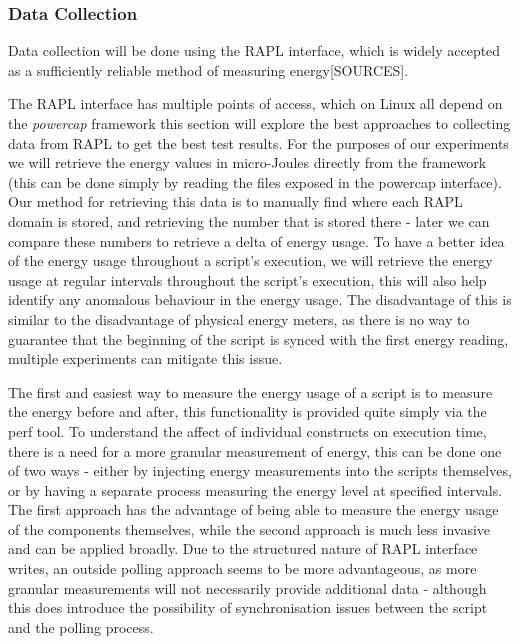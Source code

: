 \subsubsection{Data Collection}\label{subsubsec:intro-data-collection}
Data collection will be done using the RAPL interface, which is widely accepted as a sufficiently reliable method of
measuring energy[SOURCES].

The RAPL interface has multiple points of access, which on Linux all depend on the \textit{powercap}
framework\cite{LinuxPowerCap} this section will explore the best approaches to collecting data from RAPL to get the best
test results.
For the purposes of our experiments we will retrieve the energy values in micro-Joules directly from the framework (this
can be done simply by reading the files exposed in the powercap interface).
Our method for retrieving this data is to manually find where each RAPL domain is stored, and retrieving the number that
is stored there - later we can compare these numbers to retrieve a delta of energy usage.
To have a better idea of the energy usage throughout a script's execution, we will retrieve the energy usage at regular
intervals throughout the script's execution, this will also help identify any anomalous behaviour in the energy usage.
The disadvantage of this is similar to the disadvantage of physical energy meters, as there is no way to guarantee that
the beginning of the script is synced with the first energy reading, multiple experiments can mitigate this issue.

The first and easiest way to measure the energy usage of a script is to measure the energy before and after, this
functionality is provided quite simply via the perf tool.
To understand the affect of individual constructs on execution time, there is a need for a more granular measurement of
energy, this can be done one of two ways - either by injecting energy measurements into the scripts themselves, or
by having a separate process measuring the energy level at specified intervals.
The first approach has the advantage of being able to measure the energy usage of the components themselves, while the
second approach is much less invasive and can be applied broadly.
Due to the structured nature of RAPL interface writes, an outside polling approach seems to be more advantageous, as
more granular measurements will not necessarily provide additional data - although this does introduce the possibility
of synchronisation issues between the script and the polling process.


